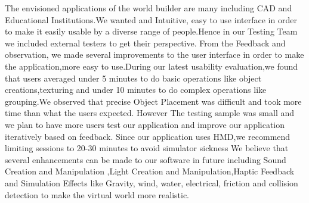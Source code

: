 The envisioned applications of the world builder are many including CAD and Educational Institutions.We wanted and Intuitive, easy to use interface in order to make it easily usable by a diverse range of people.Hence in our Testing Team we included external testers to get their perspective. From the  Feedback and observation, we made several improvements to the user interface in order to make the application,more easy to use.During our latest usability evaluation,we found that users averaged under 5 minutes to do basic operations like object creations,texturing and under 10 minutes to do  complex operations like grouping.We  observed that precise Object Placement was difficult and took more time than what the users expected. However The testing sample was small and we plan to have more users  test our application and improve our application iteratively based on feedback.
Since our application uses HMD,we recommend limiting sessions to 20-30 minutes to avoid simulator sickness 
We believe that several enhancements can be made to our software  in future including Sound Creation and Manipulation ,Light Creation and Manipulation,Haptic Feedback
and Simulation Effects like Gravity, wind, water, electrical, friction and collision detection to make the virtual world more realistic.